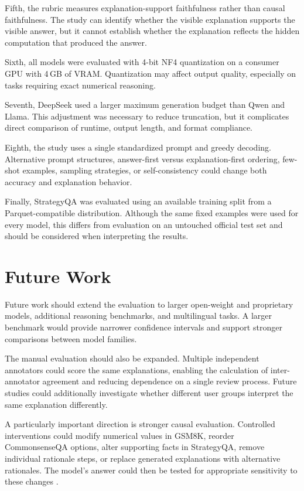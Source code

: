 \documentclass{article}
\begin{document}
Fifth, the rubric measures explanation-support faithfulness rather than
causal faithfulness. The study can identify whether the visible
explanation supports the visible answer, but it cannot establish whether
the explanation reflects the hidden computation that produced the
answer.

Sixth, all models were evaluated with 4-bit NF4 quantization on a
consumer GPU with 4\,GB of VRAM. Quantization may affect output quality,
especially on tasks requiring exact numerical reasoning.

Seventh, DeepSeek used a larger maximum generation budget than Qwen and
Llama. This adjustment was necessary to reduce truncation, but it
complicates direct comparison of runtime, output length, and format
compliance.

Eighth, the study uses a single standardized prompt and greedy decoding.
Alternative prompt structures, answer-first versus explanation-first
ordering, few-shot examples, sampling strategies, or self-consistency
could change both accuracy and explanation behavior.

Finally, StrategyQA was evaluated using an available training split from
a Parquet-compatible distribution. Although the same fixed examples were
used for every model, this differs from evaluation on an untouched
official test set and should be considered when interpreting the
results.
\section{Future Work}

Future work should extend the evaluation to larger open-weight and
proprietary models, additional reasoning benchmarks, and multilingual
tasks. A larger benchmark would provide narrower confidence intervals
and support stronger comparisons between model families.

The manual evaluation should also be expanded. Multiple independent
annotators could score the same explanations, enabling the calculation
of inter-annotator agreement and reducing dependence on a single
review process. Future studies could additionally investigate whether
different user groups interpret the same explanation differently.

A particularly important direction is stronger causal evaluation.
Controlled interventions could modify numerical values in GSM8K,
reorder CommonsenseQA options, alter supporting facts in StrategyQA,
remove individual rationale steps, or replace generated explanations
with alternative rationales. The model's answer could then be tested
for appropriate sensitivity to these changes
\cite{lanham2023measuring,matton2025walk,zaman2025causal}.
\end{document}
